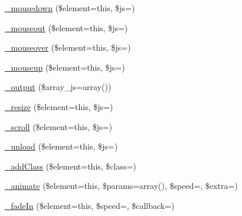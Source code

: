 \begin{DoxyCompactItemize}
\item 
\mbox{\hyperlink{class_c_i___jquery_a38a63d5e80047368cb0da3c753a935ad}{\+\_\+mousedown}} (\$element=\textquotesingle{}this\textquotesingle{}, \$js=\textquotesingle{}\textquotesingle{})
\item 
\mbox{\hyperlink{class_c_i___jquery_aacdc8794c5bac47c91e9030b3f6a4a5d}{\+\_\+mouseout}} (\$element=\textquotesingle{}this\textquotesingle{}, \$js=\textquotesingle{}\textquotesingle{})
\item 
\mbox{\hyperlink{class_c_i___jquery_a088ad6a426b26b9bd12d0dfe2262ac13}{\+\_\+mouseover}} (\$element=\textquotesingle{}this\textquotesingle{}, \$js=\textquotesingle{}\textquotesingle{})
\item 
\mbox{\hyperlink{class_c_i___jquery_aa720e3e22be279534ae106bf9c6ddb1f}{\+\_\+mouseup}} (\$element=\textquotesingle{}this\textquotesingle{}, \$js=\textquotesingle{}\textquotesingle{})
\item 
\mbox{\hyperlink{class_c_i___jquery_afdad71f4467f6b7e2ffce555cdb19581}{\+\_\+output}} (\$array\+\_\+js=array())
\item 
\mbox{\hyperlink{class_c_i___jquery_a1c14289076fe863c4289102e59803888}{\+\_\+resize}} (\$element=\textquotesingle{}this\textquotesingle{}, \$js=\textquotesingle{}\textquotesingle{})
\item 
\mbox{\hyperlink{class_c_i___jquery_ae5c1c367688e1a5f1569e4c63e8240b7}{\+\_\+scroll}} (\$element=\textquotesingle{}this\textquotesingle{}, \$js=\textquotesingle{}\textquotesingle{})
\item 
\mbox{\hyperlink{class_c_i___jquery_a6fe38cd7c52368076f3471cc7a3037fb}{\+\_\+unload}} (\$element=\textquotesingle{}this\textquotesingle{}, \$js=\textquotesingle{}\textquotesingle{})
\item 
\mbox{\hyperlink{class_c_i___jquery_a58a6c8326a425bd7e5c94be0934d4f8f}{\+\_\+add\+Class}} (\$element=\textquotesingle{}this\textquotesingle{}, \$class=\textquotesingle{}\textquotesingle{})
\item 
\mbox{\hyperlink{class_c_i___jquery_aca649039a145cd8e46388c2de51f6dc0}{\+\_\+animate}} (\$element=\textquotesingle{}this\textquotesingle{}, \$params=array(), \$speed=\textquotesingle{}\textquotesingle{}, \$extra=\textquotesingle{}\textquotesingle{})
\item 
\mbox{\hyperlink{class_c_i___jquery_a03d20a752982eded76e0d8ff30d8e609}{\+\_\+fade\+In}} (\$element=\textquotesingle{}this\textquotesingle{}, \$speed=\textquotesingle{}\textquotesingle{}, \$callback=\textquotesingle{}\textquotesingle{})
\item 

\end{DoxyCompactItemize}
